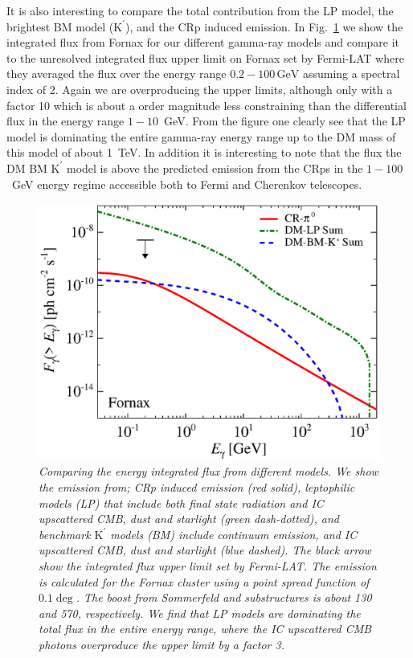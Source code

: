 \documentclass[10pt,aps,pra,reprint,amsmath,amsfonts,amssymb,showpacs]{revtex4-1}
\newcommand{\rmn}{\mathrm}
\newcommand{\Kp}{\rmn{K}^\prime}
\newcommand{\gev}{\rmn{GeV}}
\begin{document}
It is also interesting to compare the total contribution from the LP
model, the brightest BM model ($\Kp$), and the CRp induced emission. In
Fig.~\ref{fig:flux_int} we show the integrated flux from Fornax for
our different gamma-ray models and compare it to the unresolved
integrated flux upper limit on Fornax set by Fermi-LAT where they
averaged the flux over the energy range $0.2-100\,\gev$ assuming a
spectral index of 2. Again we are overproducing the upper limits,
although only with a factor 10 which is about a order magnitude less
constraining than the differential flux in the energy range
$1-10$~GeV. From the figure one clearly see that the LP model is
dominating the entire gamma-ray energy range up to the DM mass of this
model of about 1~TeV. In addition it is interesting to note that the
flux the DM BM $\Kp$ model is above the predicted emission from the
CRps in the $1-100$~GeV energy regime accessible both to Fermi and
Cherenkov telescopes.

\begin{figure}
 \includegraphics[width=0.99\columnwidth]{figures/flux.int.v10.0.1deg.1.6T.SubMass.SF300.IR2.noMW.woGal.eps}
\caption{\it Comparing the energy integrated flux from different
  models. We show the emission from; CRp induced emission (red solid),
  leptophilic models (LP) that include both final state radiation and
  IC upscattered CMB, dust and starlight (green dash-dotted), and
  benchmark $\Kp$ models (BM) include continuum emission, and IC
  upscattered CMB, dust and starlight (blue dashed). The black arrow
  show the integrated flux upper limit set by Fermi-LAT. The emission
  is calculated for the Fornax cluster using a point spread function
  of $0.1\deg$. The boost from Sommerfeld and substructures is about
  130 and 570, respectively. We find that LP models are dominating the
  total flux in the entire energy range, where the IC upscattered CMB
  photons overproduce the upper limit by a factor 3.}
 \label{fig:flux_int}
\end{figure}
\end{document}
